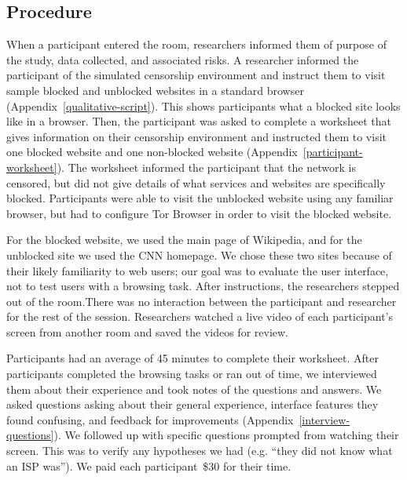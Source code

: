 \documentclass[USenglish,oneside,twocolumn]{article}
\begin{document}
\subsection{Procedure}
{\color {blue}
When a participant entered the room, researchers informed them of purpose of the study, data collected, and associated risks. 
A researcher informed the participant of the simulated censorship environment and
instruct them to visit sample blocked and unblocked websites
in a standard browser (Appendix~\ref{qualitative-script}). 
This shows participants what a blocked site looks like in a browser. 
Then, the participant was asked to complete a worksheet that gives information
on their censorship environment and instructed them
to visit one blocked website and one non-blocked website (Appendix~\ref{participant-worksheet}).
The worksheet informed the participant that the network is censored,
but did not give details of what services and websites are specifically blocked.
Participants were able to visit the unblocked website using any familiar browser,
but had to configure Tor Browser in order to visit the blocked website.
 
For the blocked website, we used the main page of Wikipedia,
and for the unblocked site we used the CNN homepage.
We chose these two sites because of their likely familiarity to web users;
our goal was to evaluate the user interface, not to test users with a browsing task.
After instructions, the researchers stepped out of the room.There was no interaction
between the participant and researcher for the rest of the session.
Researchers watched a live video of each participant's screen from another room
and saved the videos for review.

Participants had an average of 45 minutes to complete their worksheet. 
After participants completed the browsing tasks or ran out of time,
we interviewed them about their experience and
took notes of the questions and answers.
We asked questions asking about their general experience, 
interface features they found confusing, and feedback for improvements (Appendix~\ref{interview-questions}). 
We followed up with specific questions prompted from watching their screen. 
This was to verify any hypotheses we had (e.g. ``they did not know what an ISP was'').
We paid each participant~\$30 for their time. 
}
\end{document}
